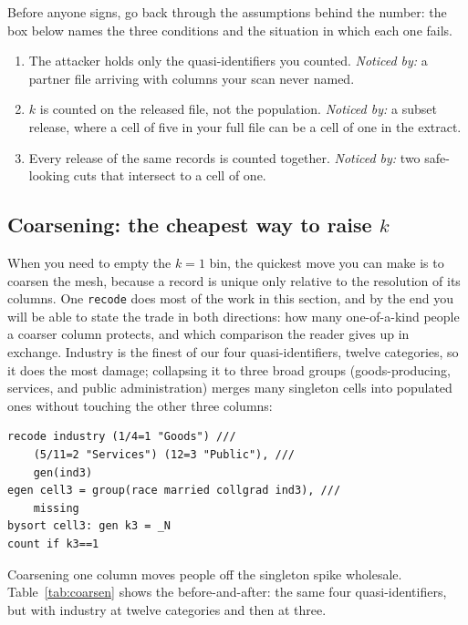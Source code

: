 \documentclass[
    a4paper,
    fontsize=10pt,
    twoside=true,
    numbers=noenddot,
]{kaobook}
\newenvironment{restson}[1][What this depends on]{%
    \begin{restsonbox}[frametitle={#1}]%
}{%
    \end{restsonbox}%
}
\begin{document}
Before anyone signs, go back through the assumptions behind the number: the box below names the three conditions and the situation in which each one fails.

\begin{restson}[What the $k$-anonymity number depends on]
\begin{enumerate}
\item The attacker holds only the quasi-identifiers you counted. \emph{Noticed by:} a partner file arriving with columns your scan never named.
\item $k$ is counted on the released file, not the population. \emph{Noticed by:} a subset release, where a cell of five in your full file can be a cell of one in the extract.
\item Every release of the same records is counted together. \emph{Noticed by:} two safe-looking cuts that intersect to a cell of one.
\end{enumerate}
\end{restson}

\subsection{Coarsening: the cheapest way to raise \texorpdfstring{$k$}{k}}\label{sec:coarsen}
When you need to empty the $k=1$ bin, the quickest move you can make is to coarsen the mesh, because a record is unique only relative to the resolution of its columns. One \texttt{recode} does most of the work in this section, and by the end you will be able to state the trade in both directions: how many one-of-a-kind people a coarser column protects, and which comparison the reader gives up in exchange. Industry is the finest of our four quasi-identifiers, twelve categories, so it does the most damage; collapsing it to three broad groups (goods-producing, services, and public administration) merges many singleton cells into populated ones without touching the other three columns:
\par
{\footnotesize
\begin{verbatim}
recode industry (1/4=1 "Goods") ///
    (5/11=2 "Services") (12=3 "Public"), ///
    gen(ind3)
egen cell3 = group(race married collgrad ind3), ///
    missing
bysort cell3: gen k3 = _N
count if k3==1
\end{verbatim}
}
Coarsening one column moves people off the singleton spike wholesale. Table~\ref{tab:coarsen} shows the before-and-after: the same four quasi-identifiers, but with industry at twelve categories and then at three.
\end{document}

